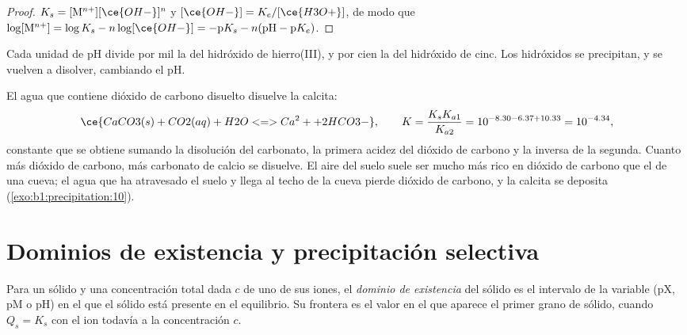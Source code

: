 \begin{proof}
$K_s = [\mathrm{M}^{n+}][\ce{OH-}]^n$ y $[\ce{OH-}] = K_e/[\ce{H3O+}]$, de
modo que $\log[\mathrm{M}^{n+}] = \log K_s - n\log[\ce{OH-}] = -\mathrm{p}K_s -
n(\mathrm{pH} - \mathrm{p}K_e)$.
\end{proof}

Cada unidad de pH divide por mil la  del hidróxido de
hierro(III), y por cien la del hidróxido de cinc. Los hidróxidos se
precipitan, y se vuelven a disolver, cambiando el pH.

\begin{example}\label{ex:b1:precipitation:cave}
El agua que contiene dióxido de carbono disuelto disuelve la calcita:
\[
  \ce{CaCO3(s) + CO2(aq) + H2O <=> Ca^2+ + 2HCO3-}, \qquad
  K = \frac{K_s K_{a1}}{K_{a2}} = 10^{-8.30 - 6.37 + 10.33} = 10^{-4.34} ,
\]
constante que se obtiene sumando la disolución del carbonato, la primera
acidez del dióxido de carbono y la inversa de la segunda. Cuanto más
dióxido de carbono, más carbonato de calcio se disuelve. El aire del
suelo suele ser mucho más rico en dióxido de carbono que el de una cueva;
el agua que ha atravesado el suelo y llega al techo de la cueva pierde
dióxido de carbono, y la calcita se deposita
(\cref{exo:b1:precipitation:10}).
\end{example}

\section{Dominios de existencia y precipitación selectiva}\label{sec:b1:precipitation:domains}

\begin{definition}\label{def:b1:precipitation:existence-domain}
Para un sólido y una concentración total dada $c$ de uno de sus iones, el
\emph{dominio de existencia} del sólido es el
intervalo de la variable (pX, pM o pH) en el que el sólido está presente
en el equilibrio. Su frontera es el valor en el que aparece el primer
grano de sólido, cuando $Q_s = K_s$ con el ion todavía a la concentración
$c$.
\end{definition}

